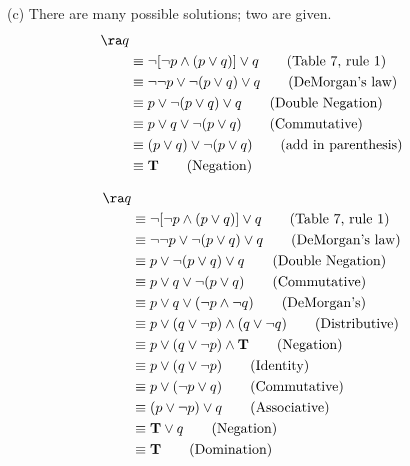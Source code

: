 \begin{questions}
\begin{solution}
    (c)
    There are many possible solutions; two are given.
	\small
    \begin{align*}
        [ \neg p & \wedge (p \vee q) ] \ra q \\
        & \equiv \neg [ \neg p \wedge (p \vee q) ] \vee q \tag{Table 7, rule 1} \\
        & \equiv \neg \neg p \vee \neg (p \vee q) \vee q \tag{DeMorgan's law} \\
        & \equiv p \vee \neg (p \vee q) \vee q \tag{Double Negation} \\
        & \equiv p \vee q \vee \neg (p \vee q) \tag{Commutative} \\
        & \equiv (p \vee q) \vee \neg (p \vee q) \tag{add in parenthesis}\\
        & \equiv \mathbf{T} \tag{Negation} 
    \end{align*}

    \begin{align*}
        [ \neg p & \wedge (p \vee q) ] \ra q \\
        & \equiv \neg [ \neg p \wedge (p \vee q) ] \vee q \tag{Table 7, rule 1} \\
        & \equiv \neg \neg p \vee \neg (p \vee q) \vee q \tag{DeMorgan's law} \\
        & \equiv p \vee \neg (p \vee q) \vee q \tag{Double Negation} \\
        & \equiv p \vee q \vee \neg (p \vee q) \tag{Commutative} \\
        & \equiv p \vee q \vee (\neg p \wedge \neg q) \tag{DeMorgan's} \\
        & \equiv p \vee (q \vee \neg p) \wedge (q \vee \neg q) \tag{Distributive} \\
        & \equiv p \vee (q \vee \neg p) \wedge \mathbf{T} \tag{Negation} \\
        & \equiv p \vee (q \vee \neg p) \tag{Identity} \\
        & \equiv p \vee (\neg p \vee q) \tag{Commutative} \\
        & \equiv (p \vee \neg p) \vee q \tag{Associative} \\
        & \equiv \mathbf{T} \vee q \tag{Negation} \\
        & \equiv \mathbf{T} \tag{Domination}
    \end{align*}
    \end{solution}

\end{questions}

